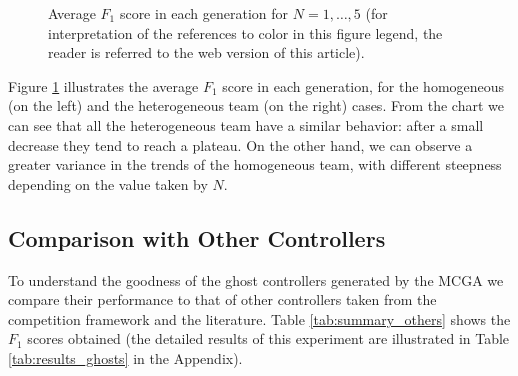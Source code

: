 \documentclass[journal]{IEEEtran}
\begin{document}
\begin{figure}[!t]
  \caption{Average $F_1$ score in each generation for $N=1,\ldots,5$ (for interpretation of the references to color in this figure legend, the reader is referred to the web version of this article).}
  \label{fig:GA_trend}
  \centering
\end{figure}

Figure \ref{fig:GA_trend} illustrates the average $F_1$ score in each generation, for the homogeneous (on the left) and the heterogeneous team (on the right) cases. From the chart we can see that all the heterogeneous team have a similar behavior: after a small decrease they tend to reach a plateau. On the other hand, we can observe a greater variance in the trends of the homogeneous team, with different steepness depending on the value taken by $N$.

\subsection{Comparison with Other Controllers}
To understand the goodness of the ghost controllers generated by the MCGA we compare their performance to that of other controllers taken from the competition framework and the literature. Table \ref{tab:summary_others} shows the $F_1$ scores obtained (the detailed results of this experiment are illustrated in Table \ref{tab:results_ghosts} in the Appendix).
\end{document}
